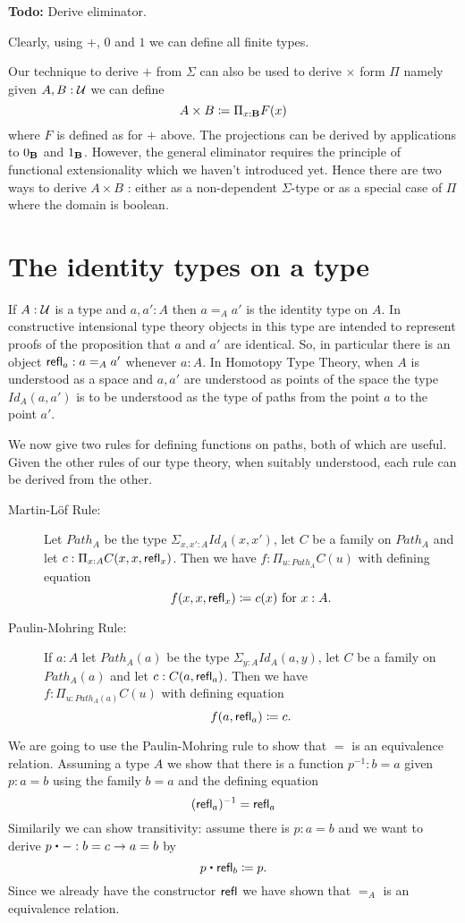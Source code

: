 \textbf{Todo:} Derive eliminator.

Clearly, using $+$, $0$ and $1$ we can define all finite types.

Our technique to derive $+$ from $\Sigma$ can also be used to derive
$\times$ form $\Pi$ namely given $A,B:{\mathcal U}$ we can define 
\[ A \times B \coloneqq \Pi_{x:{\bf B}}F(x)\]
where $F$ is defined as for $+$ above. The projections can be derived
by applications to $0_{\bf B}$ and $1_{\bf B}$. However, the general
eliminator requires the principle of functional extensionality which
we haven't introduced yet. Hence there are two ways to derive $A\times
B$ : either as a non-dependent $\Sigma$-type or as a special case of
$\Pi$ where the domain is boolean. 

\section{The identity types on a type}
If $A:{\mathcal U}$ is a type and $a,a':A$ then $a =_A a'$ is the identity type on $A$.  
In constructive intensional type theory objects in this type are
intended to represent proofs of the proposition that $a$ and $a'$ are
identical.  So, in particular there is an object $\mathsf{refl}_{a}: a =_A a'$ whenever $a:A$.  In Homotopy Type Theory, when $A$ is understood as a space and $a,a'$ are understood as points of the space the type $Id_A(a,a')$ is to be understood as the type of paths from the point $a$ to the point $a'$.

We now give two rules for defining functions on paths, both of which are useful.  Given the other rules of our type theory, when suitably understood, each rule can be derived from the other. 

\begin{description}
\item[Martin-L\"{o}f Rule:] Let $Path_A$ be the type $\Sigma_{x,x':A}Id_A(x,x')$, let $C$ be a family on $Path_A$ and let $c:\Pi_{x:A}C(x,x,\mathsf{refl}_{x})$.  Then we have $f:\Pi_{u:Path_A}C(u)$ with defining equation
  \[ f(x,x,\mathsf{refl}_{x})\coloneqq c(x)\mbox{ for } x:A.\]
\item[Paulin-Mohring Rule:] If $a:A$ let $Path_A(a)$ be the type $\Sigma_{y:A}Id_A(a,y)$, let $C$ be a family on $Path_A(a)$ and let $c:C(a,\mathsf{refl}_{a})$. Then we have\\ $f:\Pi_{u:Path_A(a)}C(u)$ with defining equation
    \[ f(a,\mathsf{refl}_{a})\coloneqq c.\]
\end{description}

We are going to use the Paulin-Mohring rule to show that $=$ is an
equivalence relation. Assuming a type $A$ we show that there is a function
$p^{-1} : b = a$ given $p : a = b$ using the family $b = a$ and
the defining equation
\[ (\mathsf{refl}_{a})^{-1} = \mathsf{refl}_{a} \]
Similarily we can show transitivity: assume there is $p : a = b$ and
we want to derive $p \ct - : b = c \to a = b$ by
\[ p \ct \refl{b} \defeq p.\]
Since we already have the constructor $\mathsf{refl}_{}$ we have shown that $=_A$
is an equivalence relation. 



